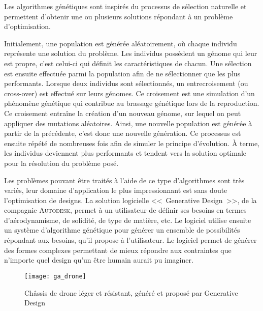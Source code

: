 Les algorithmes génétiques sont inspirés du processus de sélection naturelle et permettent d'obtenir une ou plusieurs solutions répondant à un problème d'optimisation.

Initialement, une population est générée aléatoirement, où chaque individu représente une solution du problème.
Les individus possèdent un génome qui leur est propre, c'est celui-ci qui définit les caractéristiques de chacun.
Une sélection est ensuite effectuée parmi la population afin de ne sélectionner que les plus performants.
Lorsque deux individus sont sélectionnés, un entrecroisement (ou cross-over) est effectué sur leurs génomes.
Ce croisement est une simulation d'un phénomène génétique qui contribue au brassage génétique lors de la reproduction.
Ce croisement entraîne la création d'un nouveau génome, sur lequel on peut appliquer des mutations aléatoires.
Ainsi, une nouvelle population est générée à partir de la précédente, c'est donc une nouvelle génération.
Ce processus est ensuite répété de nombreuses fois afin de simuler le principe d'évolution.
À terme, les individus deviennent plus performants et tendent vers la solution optimale pour la résolution du problème posé.

Les problèmes pouvant être traités à l'aide de ce type d'algorithmes sont très variés, leur domaine d'application le plus impressionnant est sans doute l'optimisation de designs.
La solution logicielle <<~Generative Design~>>, de la compagnie \textsc{Autodesk}, permet à un utilisateur de définir ses besoins en termes d'aérodynamisme, de solidité, de type de matière, etc.
Le logiciel utilise ensuite un système d'algorithme génétique pour générer un ensemble de possibilités répondant aux besoins, qu'il propose à l'utilisateur.
Le logiciel permet de générer des formes complexes permettant de mieux répondre aux contraintes que n'importe quel design qu'un être humain aurait pu imaginer.

\FloatBarrier
\begin{figure}[h!]
    \begin{minipage}[c]{0.4\textwidth}
        \begin{center}
            \texttt{[image: ga\_drone]}
        \end{center}
    \end{minipage}\hfill
    \begin{minipage}[c]{0.5\textwidth}
        \caption{Châssis de drone léger et résistant, généré et proposé par Generative Design}
        \label{figure:drone}
    \end{minipage}
\end{figure}
\FloatBarrier

